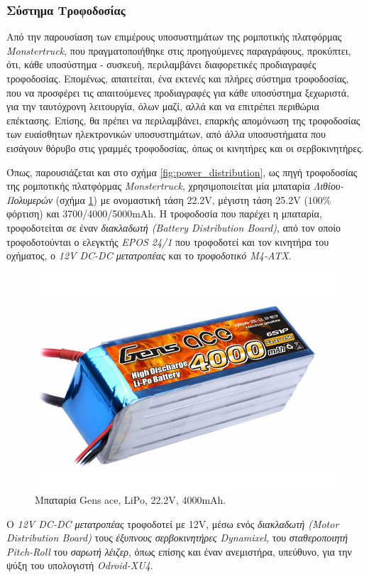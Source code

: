 \subsubsection{Σύστημα Τροφοδοσίας}
Από την παρουσίαση των επιμέρους υποσυστημάτων της ρομποτικής πλατφόρμας \textit{Monstertruck}, που πραγματοποιήθηκε στις προηγούμενες παραγράφους, προκύπτει, ότι, κάθε υποσύστημα - συσκευή, περιλαμβάνει διαφορετικές προδιαγραφές τροφοδοσίας. Επομένως, απαιτείται, ένα εκτενές και πλήρες σύστημα τροφοδοσίας, που να προσφέρει τις απαιτούμενες προδιαγραφές για κάθε υποσύστημα ξεχωριστά, για την ταυτόχρονη λειτουργία, όλων μαζί, αλλά και να επιτρέπει περιθώρια επέκτασης. Επίσης, θα πρέπει να περιλαμβάνει, επαρκής απομόνωση της τροφοδοσίας των ευαίσθητων ηλεκτρονικών υποσυστημάτων, από άλλα υποσυστήματα που εισάγουν θόρυβο στις γραμμές τροφοδοσίας, όπως οι κινητήρες και οι σερβοκινητήρες. 

\bigskip
Όπως, παρουσιάζεται και στο σχήμα \ref{fig:power_distribution}, ως πηγή τροφοδοσίας της ρομποτικής πλατφόρμας \textit{Monstertruck}, χρησιμοποιείται μία μπαταρία \textit{Λιθίου-Πολυμερών} (σχήμα \ref{fig:battery}) με ονομαστική τάση 22.2V, μέγιστη τάση 25.2V ($100\%$ φόρτιση) και 3700/4000/5000mAh. Η τροφοδοσία που παρέχει η μπαταρία, τροφοδοτείται σε έναν \textit{διακλαδωτή (Battery Distribution Board)}, από τον οποίο τροφοδοτούνται ο ελεγκτής \textit{EPOS 24/1} που τροφοδοτεί και τον κινητήρα του οχήματος, ο \textit{12V DC-DC μετατροπέας} και το \textit{τροφοδοτικό M4-ATX}.

\begin{figure}[!ht]
	\centering
	\includegraphics[width=0.3\linewidth]{Chapters/Chapter2/Figures/battery.png}
	\caption{Μπαταρία Gens ace, LiPo, 22.2V, 4000mAh.}
	\label{fig:battery}
\end{figure}

Ο \textit{12V DC-DC μετατροπέας} τροφοδοτεί με 12V, μέσω ενός \textit{διακλαδωτή (Motor Distribution Board)} τους \textit{έξυπνους σερβοκινητήρες Dynamixel}, του \textit{σταθεροποιητή Pitch-Roll} του \textit{σαρωτή λέιζερ}, όπως επίσης και έναν ανεμιστήρα, υπεύθυνο, για την ψύξη του υπολογιστή \textit{Odroid-XU4}.

